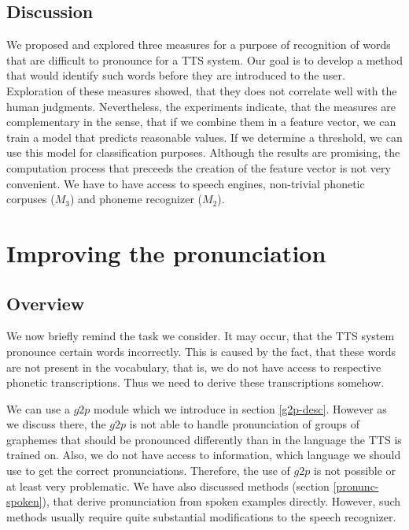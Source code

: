 \subsection{Discussion}
We proposed and explored three measures for a purpose of recognition of words that are difficult to pronounce for a TTS system.
Our goal is to develop a method that would identify such words before they are introduced to the user.
Exploration of these measures showed, that they does not correlate well with the human judgments.
Nevertheless, the experiments indicate, that the measures are complementary in the sense, that if we combine them in a feature vector, we can train a model that predicts reasonable values.
If we determine a threshold, we can use this model for classification purposes.
Although the results are promising, the computation process that preceeds the creation of the feature vector is not very convenient.
We have to have access to speech engines, non-trivial phonetic corpuses ($M_3$) and phoneme recognizer ($M_2$).
\section{Improving the pronunciation}
\subsection{Overview}
We now briefly remind the task we consider.
It may occur, that the TTS system pronounce certain words incorrectly.
This is caused by the fact, that these words are not present in the vocabulary, that is, we do not have access to respective phonetic transcriptions.
Thus we need to derive these transcriptions somehow.
\par
We can use a $g2p$ module which we introduce in section \ref{g2p-desc}.
However as we discuss there, the $g2p$ is not able to handle pronunciation of groups of graphemes that should be pronounced differently than in the language the TTS is trained on.
Also, we do not have access to information, which language we should use to get the correct pronunciations.
Therefore, the use of $g2p$ is not possible or at least very problematic.
We have also discussed methods (section \ref{pronunc-spoken}), that derive pronunciation from spoken examples directly.
However, such methods usually require quite substantial modifications to the speech recognizer.
